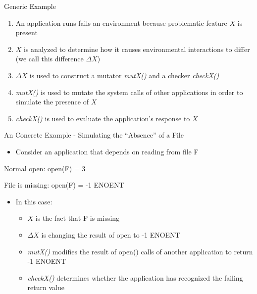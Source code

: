 \documentclass[pdf]{beamer}
\begin{document}
\begin{frame}{Generic Example}
  \begin{enumerate}
    \item{An application runs fails an environment because problematic
      feature $X$ is present}
    \item{$X$ is analyzed to determine how it causes environmental
      interactions to differ (we call this difference $\Delta X$)}
    \item{$\Delta X$ is used to construct a mutator \textit{mutX()} and
      a checker \textit{checkX()}}
    \item{\textit{mutX()} is used to mutate the system calls of other
      applications in order to simulate the presence of $X$}
    \item{\textit{checkX()} is used to evaluate the application's response
      to $X$}
  \end{enumerate}
\end{frame}


\begin{frame}{An Concrete Example - Simulating the ``Absence'' of a File}
  \begin{itemize}
    \item{Consider an application that depends on reading from file F}
  \end{itemize}

  Normal open: open(F) = 3

  File is missing: open(F) = -1 ENOENT

  \begin{itemize}
    \item{In this case:}
      \begin{itemize}
        \item{$X$ is the fact that F is missing}
        \item{$\Delta X$ is changing the result of open to -1 ENOENT}
        \item{\textit{mutX()} modifies the result of open() calls of another
          application to return -1 ENOENT}
        \item{\textit{checkX()} determines whether the application has
          recognized the failing return value}
      \end{itemize}
  \end{itemize}
\end{frame}
\end{document}
